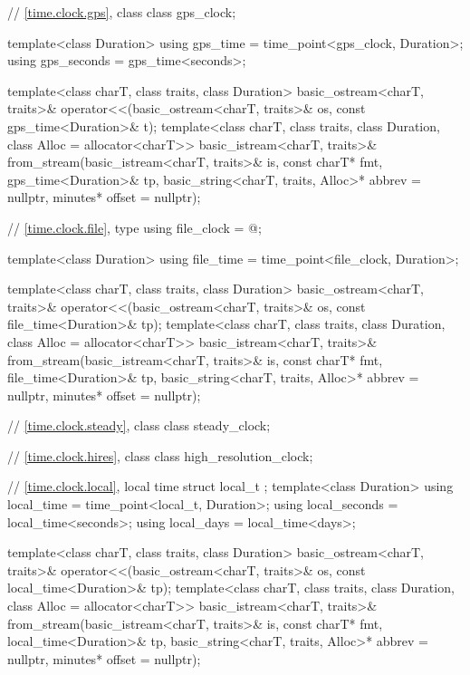 \begin{codeblock}
{{    // \ref{time.clock.gps}, class 
    class gps_clock;

    template<class Duration>
      using gps_time  = time_point<gps_clock, Duration>;
    using gps_seconds = gps_time<seconds>;

    template<class charT, class traits, class Duration>
      basic_ostream<charT, traits>&
        operator<<(basic_ostream<charT, traits>& os, const gps_time<Duration>& t);
    template<class charT, class traits, class Duration, class Alloc = allocator<charT>>
      basic_istream<charT, traits>&
        from_stream(basic_istream<charT, traits>& is, const charT* fmt,
                    gps_time<Duration>& tp,
                    basic_string<charT, traits, Alloc>* abbrev = nullptr,
                    minutes* offset = nullptr);

    // \ref{time.clock.file}, type 
    using file_clock = @\seebelow@;

    template<class Duration>
      using file_time = time_point<file_clock, Duration>;

    template<class charT, class traits, class Duration>
      basic_ostream<charT, traits>&
        operator<<(basic_ostream<charT, traits>& os, const file_time<Duration>& tp);
    template<class charT, class traits, class Duration, class Alloc = allocator<charT>>
      basic_istream<charT, traits>&
        from_stream(basic_istream<charT, traits>& is, const charT* fmt,
                    file_time<Duration>& tp,
                    basic_string<charT, traits, Alloc>* abbrev = nullptr,
                    minutes* offset = nullptr);

    // \ref{time.clock.steady}, class 
    class steady_clock;

    // \ref{time.clock.hires}, class 
    class high_resolution_clock;

    // \ref{time.clock.local}, local time
    struct local_t {};
    template<class Duration>
      using local_time  = time_point<local_t, Duration>;
    using local_seconds = local_time<seconds>;
    using local_days    = local_time<days>;

    template<class charT, class traits, class Duration>
      basic_ostream<charT, traits>&
        operator<<(basic_ostream<charT, traits>& os, const local_time<Duration>& tp);
    template<class charT, class traits, class Duration, class Alloc = allocator<charT>>
      basic_istream<charT, traits>&
        from_stream(basic_istream<charT, traits>& is, const charT* fmt,
                    local_time<Duration>& tp,
                    basic_string<charT, traits, Alloc>* abbrev = nullptr,
                    minutes* offset = nullptr);

}}
\end{codeblock}
